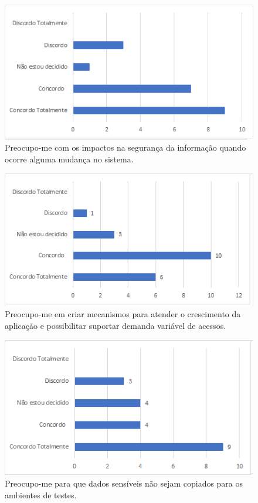 \begin{figure}[!t]
\centering
\includegraphics[scale=0.7]{figuras das questoes/4.1.png}
\caption{Preocupo-me com os impactos na segurança da informação quando ocorre alguma mudança no sistema.}
\end{figure}

\begin{figure}[!t]
\centering
\includegraphics[scale=0.7]{figuras das questoes/4.2.png}
\caption{Preocupo-me em criar mecanismos para atender o crescimento da aplicação e possibilitar suportar demanda variável de acessos.}
\end{figure}

\begin{figure}[!t]
\centering
\includegraphics[scale=0.7]{figuras das questoes/4.3.png}
\caption{Preocupo-me para que dados sensíveis não sejam copiados para os ambientes de testes.}
\end{figure}

